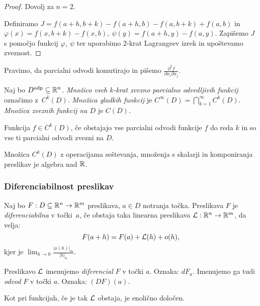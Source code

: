 \begin{proof}
    Dovolj za $n=2$. 
    
    Definiramo $J = f(a+h, b+k) - f(a+h, b) - f(a, b+k) + f(a,b)$ in $\varphi(x) = f(x, b+k) - f(x, b), \ \psi(y) = f(a+h, y) - f(a, y)$. Zapišemo $J$ s pomočjo funkcij $\varphi, \ \psi$ ter uporabimo 2-krat Lagrangeev izrek in upoštevamo zveznost.
\end{proof}

\begin{opomba}
     Pravimo, da parcialni odvodi komutirajo in pišemo $\frac{\partial^2 f}{\partial x_i \partial x_j}$.
\end{opomba}

\begin{definicija}
    Naj bo $D^\text{odp} \subseteq \mathbb{R}^n$. \emph{Množico vseh $k$-krat zvezno parcialno odvedljivih funkcij} označimo z~$C^k(D)$. \emph{Množica gladkih funkcij} je $C^\infty(D) = \bigcap_{k=1}^\infty C^k(D)$. \emph{Množica zveznih funkcij na $D$} je $C(D)$.
\end{definicija}

\begin{opomba}
    Funkcija $f \in C^k(D)$, če obstajajo vse parcialni odvodi funkcije $f$ do reda $k$ in so vse ti parcialni odvodi zvezni na $D$. 
\end{opomba}

\begin{opomba}
    Množica $C^k(D)$ z operacijama seštevanja, množenja s skalarji in komponiranja preslikav je algebra nad $\mathbb{R}$.
\end{opomba}

\subsubsection{Diferenciabilnost preslikav}

\begin{definicija}
    Naj bo $F: D \subseteq \mathbb{R}^n \to \mathbb{R}^m$ preslikava, $a \in D$ notranja točka. Preslikava $F$ je \emph{diferenciabilna} v točki~$a$, če obstaja taka linearna preslikava $\mathcal{L}: \mathbb{R}^n \to \mathbb{R}^m$, da velja:
    $$F(a+h) = F(a) + \mathcal{L}(h) + o(h),$$
    kjer je $\lim_{h \to 0} \frac{|o(h)|_m}{|h|_n}$. 

    Preslikavo $\mathcal{L}$ imenujemo \emph{diferencial} $F$ v točki $a$. Oznaka: $dF_a$. Imenujemo ga tudi \emph{odvod} $F$ v točki $a$. Oznaka: $(DF)(a)$.
\end{definicija}

\begin{opomba}
    Kot pri funkcijah, če je tak $\mathcal{L}$ obstaja, je enolično določen.
\end{opomba}

